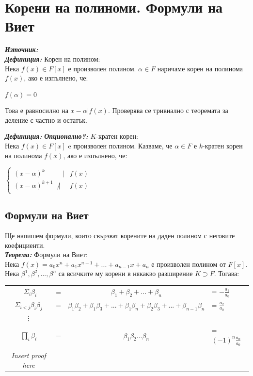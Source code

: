 \documentclass[11pt]{article} %
\newcommand{\italicBold}[1]{\textbf{\emph{#1}}}
\newcommand{\definition}{\italicBold{Дефиниция: }}
\newcommand{\theorem}{\italicBold{Теорема: }}
\newcommand{\source}{\italicBold{Източник: }}
\begin{document}
\section{Корени на полиноми. Формули на Виет}
\source {}\\

\definition Корен на полином:\\
Нека $f(x) \in F[x]$ е произволен полином. $\alpha \in F$ наричаме корен на полинома $f(x)$, ако е изпълнено, че:\\
\centerline{$f(\alpha) = 0$}
Това е равносилно на $x-\alpha|f(x)$. Проверява се тривиално с теоремата за деление с частно и остатък. \\\par

\definition \italicBold{Опционално?: }$K$-кратен корен:\\
Нека $f(x) \in F[x]$ e произволен полином. Казваме, че $\alpha \in F$ е $k$-кратен корен на полинома $f(x)$, ако е изпълнено, че:

$
   \left\{\begin{aligned}
    (x-\alpha)^{k} & \;\;|& f(x)\\
    (x-\alpha)^{k+1} & \not|& f(x)\\
   \end{aligned}\right.
$\\\par


\subsection{Формули на Виет}
Ще напишем формули, които свързват корените на даден полином с неговите коефициенти.\\

\theorem Формули на Виет:\\
Нека $f(x) = a_{0}x^{n}+a_{1}x^{n-1}+...+a_{n-1}x+a_{n}$ е произволен полином от $F[x]$.\\
Нека $\beta^{1}, \beta^{2},...,\beta^{n}$ са всичките му корени в някакво разширение $K \supset F$. Тогава:

\begin{center}\begin{tabular}{cccl}\
$\Sigma_{i}\beta_{i}$ & = & $\beta_{1}+\beta_{2}+...+\beta_{n}$ & =  $-\frac{a_{1}}{a_{0}}$ \\
$\Sigma_{i<j}\beta_{i}\beta_{j}$ & = & $\beta_{1}\beta_{2}+\beta_{1}\beta_{3}+...+\beta_{1}\beta_{n}+\beta_{2}\beta_{3}+...+\beta_{n-1}\beta_{n}$ & = $\frac{a_{2}}{a_{0}}$\\
\vdots\\
$\prod_{i}\beta_{i}$ & = & $\beta_{1}\beta_{2}...\beta_{n}$ & =
$(-1)^{n}\frac{a_{n}}{a_{0}}$\\\\\par

\centerline{\textit{Insert proof here}}
 
\end{tabular}\end{center}
\end{document}

